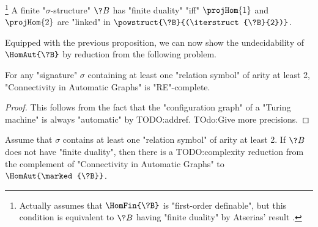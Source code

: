 \begin{proposition}%
	\!\footnote{Actually \cite[Theorem 4.7]{LaroseLotenTardif2007CharacterisationFOCSP} assumes
	that $\HomFin{\?B}$ is "first-order definable", but this condition
	is equivalent to $\?B$ having "finite duality" by Atserias' result
	\cite[Corollary 4]{Atserias2008DigraphColoring}.}%
	\AP\label{prop:characterization-finite-duality-path-projections}
	A finite "$\sigma$-structure" $\?B$ has "finite duality" "iff"
	$\projHom{1}$ and $\projHom{2}$ are "linked" in $\powstruct{\?B}{(\iterstruct{\?B}{2})}$.
\end{proposition}

Equipped with the previous proposition, we can now show the undecidability 
of $\HomAut{\?B}$ by reduction from the following problem.

\begin{property}
	\AP\label{prop:undecidability-connectivity}
	For any "signature" $\sigma$ containing at least one "relation symbol" of
	arity at least 2, "Connectivity in Automatic Graphs" is "RE"-complete.
\end{property}

\begin{proof}
	This follows from the fact that the "configuration graph" of
	a "Turing machine" is always "automatic" by TODO:addref.
	TOdo:Give more precisions.
\end{proof}

\begin{lemma}
	\AP\label{lem:reduction-hom}
	Assume that $\sigma$ contains at least one "relation symbol" of arity at least 2.
	If $\?B$ does not have "finite duality", then there is a TODO:complexity reduction 
	from the complement of "Connectivity in Automatic Graphs" to $\HomAut{\marked{\?B}}$.
\end{lemma}

